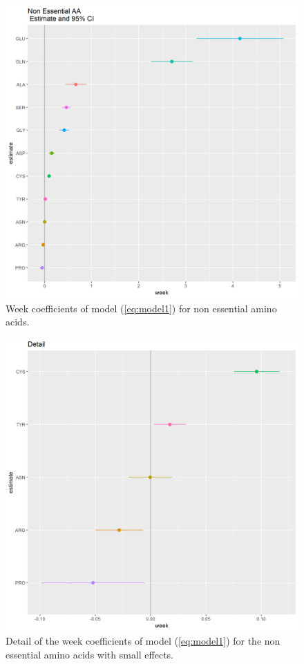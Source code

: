 \documentclass[12pt]{article}
\begin{document}
\begin{figure}[!htb]
  \includegraphics[width= \textwidth]{../week/NEAA_W_coeff.png}
  \caption{Week coefficients of model (\ref{eq:model1}) for non essential amino acids.}
  \label{fig:NEAA_W_coeff}
\end{figure}

\begin{figure}[!htb]
  \includegraphics[width= \textwidth]{../week/NEAA_W_coeff_detail.png}
  \caption{Detail of the week coefficients of model (\ref{eq:model1}) for the non essential amino acids with small effects.}
  \label{fig:NEAA_W_coeff_detail}
\end{figure}
\end{document}
